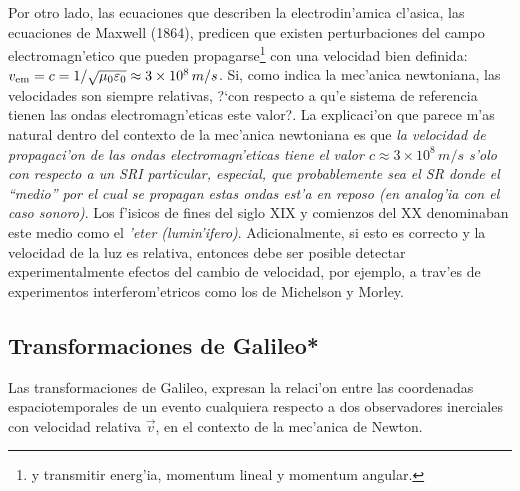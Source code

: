 Por otro lado, las ecuaciones que describen la electrodin'amica cl'asica,  las ecuaciones de Maxwell (1864), predicen que existen perturbaciones del campo electromagn'etico que pueden propagarse\footnote{y transmitir energ'ia, momentum lineal y momentum angular.} con una velocidad bien definida: $v_{\rm em}=c ={1}/{\sqrt{\mu_0\varepsilon_0}}\approx 3\times 10^{8}\,m/s$. Si, como indica la mec'anica newtoniana, las velocidades son siempre relativas, ?`con respecto a qu'e sistema de referencia tienen las ondas electromagn'eticas este valor?. La explicaci'on que parece m'as natural dentro del contexto de la mec'anica newtoniana es que \textit{la velocidad de
propagaci'on de las ondas electromagn'eticas tiene el valor $c\approx 3\times 10^{8}\,m/s$ s'olo con respecto a un SRI particular, especial, que probablemente sea el SR donde el ``medio'' por el cual se propagan estas ondas est'a en reposo (en analog'ia con el caso sonoro)}. Los f'isicos de fines del siglo XIX y comienzos del XX denominaban este medio como el \textit{'eter  (lumin'ifero)}. Adicionalmente, si esto es correcto y la velocidad de la luz es relativa, entonces debe ser posible detectar experimentalmente efectos del cambio de velocidad, por ejemplo, a trav'es de experimentos interferom'etricos como los de Michelson y Morley.

\subsection{Transformaciones de Galileo*}
Las transformaciones de Galileo, expresan la relaci'on entre las coordenadas espaciotemporales de un evento cualquiera respecto a dos observadores inerciales con velocidad relativa $\vec{v}$, en el contexto de la mec'anica de Newton.

